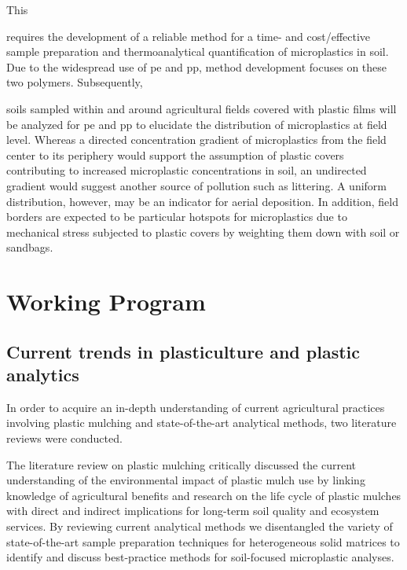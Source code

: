 \documentclass[justified,a4paper,
	nofonts,
	nobib
]{tufte-handout}
\begin{document}
This
\begin{enumerate*}
	\item requires the development of a reliable method for a time- and cost\-/effective sample preparation and thermoanalytical quantification of microplastics in soil. Due to the widespread use of \ac{pe} and \ac{pp}, method development focuses on these two polymers.
	Subsequently, \item soils sampled within and around agricultural fields covered with plastic films will be analyzed for \ac{pe} and \ac{pp} to elucidate the distribution of microplastics at field level. Whereas a directed concentration gradient of microplastics from the field center to its periphery would support the assumption of plastic covers contributing to increased microplastic concentrations in soil, an undirected gradient would suggest another source of pollution such as littering. A uniform distribution, however, may be an indicator for aerial deposition. In addition, field borders are expected to be particular hotspots for microplastics due to mechanical stress subjected to plastic covers by weighting them down with soil or sandbags.
\end{enumerate*}

\section{Working Program}\label{sec:methods}

\subsection{Current trends in plasticulture and plastic analytics}

In order to acquire an in-depth understanding of current agricultural practices involving plastic mulching and state-of-the-art analytical methods, two literature reviews were conducted.

The literature review on plastic mulching critically discussed the current understanding of the environmental impact of plastic
mulch use by linking knowledge of agricultural benefits and research on the life cycle of plastic mulches with direct and indirect implications for long-term soil quality and ecosystem services. By reviewing current analytical methods we disentangled the variety of state-of-the-art
sample preparation techniques for heterogeneous solid matrices to identify and discuss
best-practice methods for soil-focused microplastic analyses.
\end{document}
